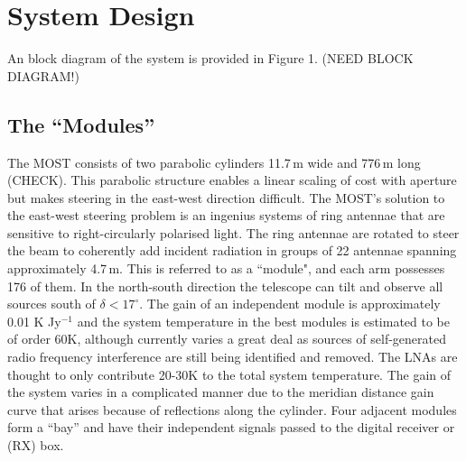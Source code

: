 \section{System Design}

An block diagram of the system is provided in Figure 1. (NEED BLOCK DIAGRAM!)

\subsection{The ``Modules''}
The MOST consists of two parabolic cylinders 11.7\,m wide and 776\,m long (CHECK). This parabolic structure enables a linear scaling of cost with aperture but makes steering in the east-west direction difficult. The MOST's solution to the east-west steering problem is an ingenius systems of ring antennae that are sensitive to right-circularly polarised light. The ring antennae are rotated to steer the beam to coherently add incident radiation in groups of 22 antennae spanning approximately 4.7\,m. This is referred to as a ``module", and each arm possesses 176 of them. In the north-south direction the telescope can tilt and observe all sources south of $\delta<17^\circ$. The gain of an independent module is approximately 0.01 K Jy$^{-1}$ and the system temperature in the best modules is estimated to be of order 60K, although currently varies a great deal as sources of self-generated radio frequency interference are still being identified and removed. The LNAs are thought to only contribute 20-30K to the total system temperature.
The gain of the system varies in a complicated manner due to the meridian distance gain curve that arises because of reflections along the cylinder\cite{Hunstead_1996}.
Four adjacent modules form a ``bay'' and have their independent signals passed to the digital receiver or (RX) box.
